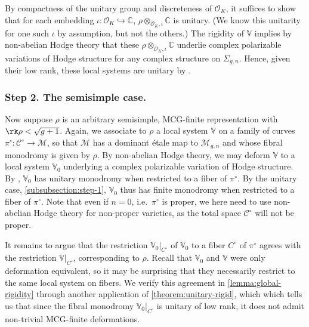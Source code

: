 By compactness of the unitary group and discreteness of $\mathscr{O}_K$, it
suffices to show that for each embedding $\iota:
\mathscr{O}_K\hookrightarrow\mathbb{C}$, $\rho\otimes_{\mathscr{O}_K, \iota}
\mathbb{C}$ is unitary. (We know this unitarity for one such $\iota$ by assumption, but not
the others.) The rigidity of $\mathbb{V}$ implies by non-abelian Hodge theory
that these $\rho\otimes_{\mathscr{O}_K, \iota} \mathbb{C}$ underlie complex polarizable variations of Hodge structure for any complex structure on $\Sigma_{g,n}$.
Hence, given their low rank, these local systems are unitary by \cite[Theorem
1.2.12]{LL:geometric-local-systems}.

\subsubsection{Step 2. The semisimple case.}
\label{subsubsection:step-2}
Now suppose $\rho$ is an arbitrary
semisimple, MCG-finite representation with $\rk\rho<\sqrt{g+1}$. Again, we
associate to $\rho$ a local system $\mathbb{V}$ on a family of curves
$\pi^\circ:\mathscr{C}^\circ\to \mathscr{M}$, so that $\mathscr M$ has a
dominant \'etale map to $\mathscr M_{g,n}$ and whose fibral monodromy is given by $\rho$.
By non-abelian Hodge theory, we may deform $\mathbb{V}$ to a local system
$\mathbb V_0$ underlying a complex polarizable
variation of Hodge structure. By
\cite[Theorem 1.2.12]{LL:geometric-local-systems}, $\mathbb{V}_0$ has unitary monodromy when
restricted to a fiber of $\pi^\circ$. By the unitary case,
\autoref{subsubsection:step-1},
$\mathbb{V}_0$ thus has finite monodromy when restricted to a fiber of $\pi^{\circ}$. Note that even if $n=0$, i.e.~$\pi^\circ$ is proper, we here need to use non-abelian Hodge theory for non-proper varieties, as the total space $\mathscr{C}^\circ$ will not be proper.

It remains to argue that the restriction $\mathbb V_0|_{C^\circ}$ of
$\mathbb V_0$ to a fiber $C^\circ$ of
$\pi^\circ$ agrees with the restriction $\mathbb V|_{C^\circ}$,
corresponding to $\rho$.
Recall that
$\mathbb V_0$ and $\mathbb V$ were only deformation equivalent, so it may be
surprising that they necessarily restrict to the same local system on fibers.
We verify this agreement
in \autoref{lemma:global-rigidity}
through another application of
\autoref{theorem:unitary-rigid}, which
which tells us that since the fibral monodromy $\mathbb{V}_0|_{C^\circ}$
is unitary of low rank, it
does not admit non-trivial MCG-finite deformations.

